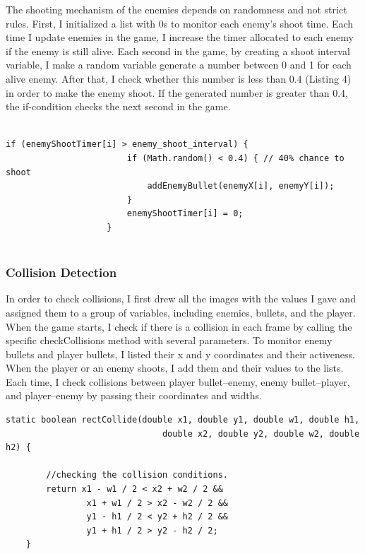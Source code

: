 \documentclass[11pt,a4paper]{article}
\begin{document}
The shooting mechanism of the enemies depends on randomness and not strict rules. First, I initialized a list with 0s to monitor each enemy's shoot time. Each time I update enemies in the game, I increase the timer allocated to each enemy if the enemy is still alive. Each second in the game, by creating a shoot interval variable, I make a random variable generate a number between 0 and 1 for each alive enemy. After that, I check whether this number is less than 0.4 (Listing 4) in order to make the enemy shoot. If the generated number is greater than 0.4, the if-condition checks the next second in the game.

\begin{lstlisting}[caption={Randomized enemy shooting.}, label={lst:enemy_move}]
     
if (enemyShootTimer[i] > enemy_shoot_interval) {
                        if (Math.random() < 0.4) { // 40% chance to shoot
                            addEnemyBullet(enemyX[i], enemyY[i]);
                        }
                        enemyShootTimer[i] = 0;
                    }


\end{lstlisting}





\subsubsection{Collision Detection}
In order to check collisions, I first drew all the images with the values I gave and assigned them to a group of variables, including enemies, bullets, and the player. When the game starts, I check if there is a collision in each frame by calling the specific checkCollisions method with several parameters. To monitor enemy bullets and player bullets, I listed their x and y coordinates and their activeness. When the player or an enemy shoots, I add them and their values to the lists. Each time, I check collisions between player bullet–enemy, enemy bullet–player, and player–enemy by passing their coordinates and widths.

\begin{lstlisting}[caption={Collision check}, label={lst:enemy_move}]
   static boolean rectCollide(double x1, double y1, double w1, double h1,
                               double x2, double y2, double w2, double h2) {
        
        //checking the collision conditions.
        return x1 - w1 / 2 < x2 + w2 / 2 &&
                x1 + w1 / 2 > x2 - w2 / 2 &&
                y1 - h1 / 2 < y2 + h2 / 2 &&
                y1 + h1 / 2 > y2 - h2 / 2;
    }


\end{lstlisting}
\end{document}
